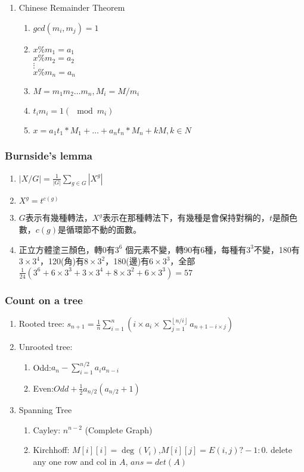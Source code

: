 \begin{enumerate}
\item{Chinese Remainder Theorem}
\begin{enumerate}\itemsep = -3pt
\item $gcd(m_i, m_j) = 1$
\item
$x \% m_1 = a_1$\\
$x \% m_2 = a_2$\\
$\vdots$ \\
$x \% m_n = a_n$
\item $M = m_1 m_2 \dots m_n, M_i = M / m_i$
\item $t_i m_i = 1 (\mod m_i)$
\item $x = a_1 t_1 * M_1 + \dots + a_n t_n * M_n + k M, k \in N$
\end{enumerate}

\end{enumerate}


\subsubsection{Burnside's lemma}
\begin{enumerate}\itemsep = -3pt
	\item $|X/G| = \frac{1}{|G|}\sum_{g \in G}|X^g|$
	\item $X^g=t^{c(g)}$
	\item $G$表示有幾種轉法，$X^g$表示在那種轉法下，有幾種是會保持對稱的，$t$是顏色數，$c(g)$是循環節不動的面數。
	\item 正立方體塗三顏色，轉0有$3^6$ 個元素不變，轉90有6種，每種有$3^3$不變，180有$3\times 3^4$，120(角)有$8\times 3^2$，180(邊)有$6\times 3^3$，全部$\frac{1}{24}\left(3^6+6\times 3^3 + 3 \times 3^4 + 8 \times 3^2 + 6 \times 3^3 \right) = 57$
\end{enumerate}

\subsubsection{Count on a tree}
\begin{enumerate}\itemsep = -3pt
	\item Rooted tree: $s_{n+1}=\frac{1}{n}\sum_{i=1}^{n}(i\times a_i\times \sum_{j=1}^{\left \lfloor  n/i\right \rfloor} a_{n+1-i\times j})$
	\item Unrooted tree: 
	\begin{enumerate}\itemsep = -2pt
		\item Odd:$a_n-\sum_{i=1}^{n/2}a_ia_{n-i}$
		\item Even:$Odd+\frac{1}{2}a_{n/2}(a_{n/2}+1)$
	\end{enumerate}
	\item Spanning Tree
	\begin{enumerate}\itemsep = -2pt
		\item Cayley: $n^{n-2}$ (Complete Graph)
		\item Kirchhoff: $M[i][i]=\deg(V_i)$,$M[i][j]= E(i,j) ? -1 : 0$. delete any one row and col in $A$, $ans = det(A)$
	\end{enumerate}
\end{enumerate}

%